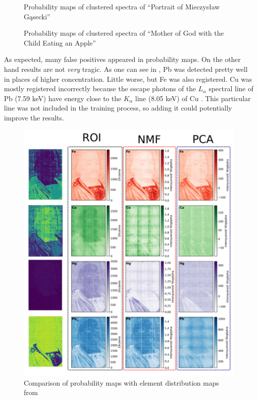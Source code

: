 \begin{figure}[H]
  \centering
  
  \caption{Probability maps of clustered spectra of ``Portrait of Mieczysław Gąsecki''}
  \label{fig:clusters-prob-gasecki}
\end{figure}

\begin{figure}[H]
  \centering
  
  \caption{Probability maps of clustered spectra of ``Mother of
God with the Child Eating an Apple''}
  \label{fig:clusters-prob-matka-boska}
\end{figure}

As expected, many false positives appeared in probability maps.
On the other hand results are not \emph{very} tragic. 
As one can see in , Pb was detected pretty well in places of higher concentration.
Little worse, but Fe was also registered.
Cu was mostly registered incorrectly because the escape photons of the $L_{\alpha}$ spectral line of Pb (7.59 keV) have energy close to the $K_{\alpha}$ line (8.05 keV) of Cu \cite{Lach2022}. 
This particular line was not included in the training process, so adding it could potentially improve the results.

\begin{figure}[htbp!]
  \centering
  \includegraphics[width=1\textwidth]{img/comparison-lach.png}
  \caption{Comparison of probability maps with element distribution maps from \cite{Lach2022}}
  \label{fig:lach-comparison}
\end{figure}


